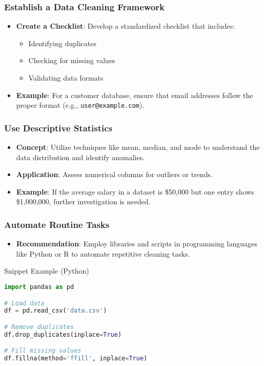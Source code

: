 \documentclass[aspectratio=169]{beamer}
\begin{document}
\begin{frame}[fragile]
    \frametitle{Establish a Data Cleaning Framework}
    \begin{itemize}
        \item \textbf{Create a Checklist}: Develop a standardized checklist that includes:
        \begin{itemize}
            \item Identifying duplicates
            \item Checking for missing values
            \item Validating data formats
        \end{itemize}
        \item \textbf{Example}: 
        For a customer database, ensure that email addresses follow the proper format (e.g., \texttt{user@example.com}).
    \end{itemize}
\end{frame}

\begin{frame}[fragile]
    \frametitle{Use Descriptive Statistics}
    \begin{itemize}
        \item \textbf{Concept}: 
        Utilize techniques like mean, median, and mode to understand the data distribution and identify anomalies.
        \item \textbf{Application}: 
        Assess numerical columns for outliers or trends.
        \item \textbf{Example}: 
        If the average salary in a dataset is \$50,000 but one entry shows \$1,000,000, further investigation is needed.
    \end{itemize}
\end{frame}

\begin{frame}[fragile]
    \frametitle{Automate Routine Tasks}
    \begin{itemize}
        \item \textbf{Recommendation}: 
        Employ libraries and scripts in programming languages like Python or R to automate repetitive cleaning tasks.
    \end{itemize}
    \begin{block}{Snippet Example (Python)}
    \begin{lstlisting}[language=Python]
import pandas as pd

# Load data
df = pd.read_csv('data.csv')

# Remove duplicates
df.drop_duplicates(inplace=True)

# Fill missing values
df.fillna(method='ffill', inplace=True)
    \end{lstlisting}
    \end{block}
\end{frame}
\end{document}
